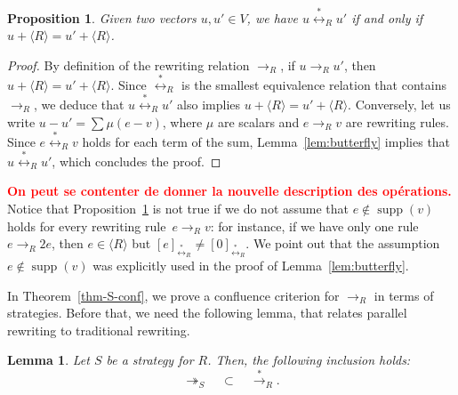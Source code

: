 \documentclass[11pt]{article}
\newtheorem{lemma}[theorem]{Lemma}
\newtheorem{proposition}[theorem]{Proposition}
\theoremstyle{definition}
\newcommand\todo[1]{{\bf\textcolor{red}{#1}}}
\DeclareMathOperator{\supp}{supp}
\newcommand\Span[1]{\langle #1\rangle}
\newcommand\rewR{\to_R}
\newcommand\parS{\twoheadrightarrow_S}
\newcommand\transR{\overset{*}{\to}_R}
\newcommand\equivR{\overset{*}{\leftrightarrow}_R}
\begin{document}
\begin{proposition}\label{prop:vs_structure}
  Given two vectors $u,u'\in V$, we have $u\equivR u'$ if and only if
  $u + \Span{R} = u'+\Span{R}$.
\end{proposition}

\begin{proof}
  By definition of the rewriting relation $\rewR$, if $u\rewR u'$, then
  $u + \Span{R} =u'+\Span{R}$. Since $\equivR$ is the smallest equivalence relation
  that contains $\rewR$, we deduce that $u\equivR u'$ also implies
  $u+\Span{R}=u'+\Span{R}$. Conversely, let us write $u-u'=\sum\mu(e-v)$, where
  $\mu$ are scalars and $e\rewR v$ are rewriting rules. Since
  $e\equivR v$ holds for each term of the sum, Lemma~\ref{lem:butterfly}
  implies that $u\equivR u'$, which concludes the proof.
\end{proof}
\smallskip

\todo{On peut se contenter de donner la nouvelle description des opérations.}
Notice that Proposition~\ref{prop:vs_structure} is not true if we do not
assume that $e\notin\supp(v)$ holds for every rewriting rule~$e\rewR v$: 
for instance, if we have only one rule $e\rewR 2e$, then $e\in\Span{R}$ 
but $[e]_{\equivR}\neq[0]_{\equivR}$. We point out that the assumption
$e\notin\supp(v)$ was explicitly used in the proof of
Lemma~\ref{lem:butterfly}.
\medskip

In Theorem~\ref{thm-S-conf}, we prove a confluence criterion for $\rewR$
in terms of strategies. Before that, we need the following lemma, that
relates parallel rewriting to traditional rewriting.
\smallskip

\begin{lemma}\label{lem:strategies}
  Let $S$ be a strategy for $R$. Then, the following inclusion holds:
  \[\parS\quad\subset\quad\transR.\]
\end{lemma}
\end{document}
